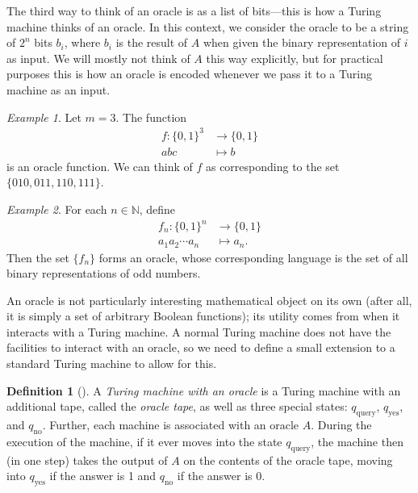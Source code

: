 \documentclass[english,12pt]{reedthesis}
\theoremstyle{plain}
\theoremstyle{definition}
\newtheorem{defn}[defn]{Definition}
\theoremstyle{remark}
\newtheorem{example}{Example}[thm]
\begin{document}
The third way to think of an oracle is as a list of bits---this is how a Turing
machine thinks of an oracle. In this context, we consider the oracle to be a
string of $2^{n}$ bits $b_{i}$, where $b_{i}$ is the result of $A$ when given
the binary representation of $i$ as input. We will mostly not think of $A$ this
way explicitly, but for practical purposes this is how an oracle is encoded
whenever we pass it to a Turing machine as an input.

\begin{example}\label{ex:oracle-function}
  Let $m = 3$. The function
  \begin{equation}
    \begin{aligned}
      f\colon \{0, 1\}^{3} &\rightarrow \{0, 1\} \\
      abc &\mapsto b
    \end{aligned}
  \end{equation}
  is an oracle function. We can think of $f$ as corresponding to the set
  $\{010, 011, 110, 111\}$.
\end{example}

\begin{example}\label{ex:oracle-full}
  For each $n \in \mathbb{N}$, define
  \begin{equation}
    \begin{aligned}
      f_{n}\colon \{0, 1\}^{n} &\rightarrow \{0, 1\} \\
      a_{1}a_{2} \cdots a_{n} &\mapsto a_{n}.
    \end{aligned}
  \end{equation}
  Then the set $\{f_{n}\}$ forms an oracle, whose corresponding language is the
  set of all binary representations of odd numbers.
\end{example}

An oracle is not particularly interesting mathematical object on its own (after
all, it is simply a set of arbitrary Boolean functions); its utility comes from
when it interacts with a Turing machine. A normal Turing machine does not have
the facilities to interact with an oracle, so we need to define a small
extension to a standard Turing machine to allow for this.

\begin{defn}[{\cite[Def.\ 3.6]{AB09}}]\label{def:tm-oracle}
  A \emph{Turing machine with an oracle} is a Turing machine with an additional
  tape, called the \emph{oracle tape}, as well as three special states:
  $q_{\text{query}}$, $q_{\text{yes}}$, and $q_{\text{no}}$. Further, each
  machine is associated with an oracle $A$. During the execution of the machine,
  if it ever moves into the state $q_{\text{query}}$, the machine then (in one
  step) takes the output of $A$ on the contents of the oracle tape, moving into
  $q_{\text{yes}}$ if the answer is 1 and $q_{\text{no}}$ if the answer is 0.
\end{defn}
\end{document}
